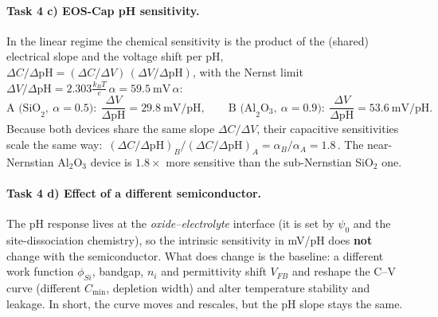 \paragraph{Task 4 c) EOS-Cap pH sensitivity.}
In the linear regime the chemical sensitivity is the product of the (shared) electrical slope and the
voltage shift per pH, $\Delta C/\Delta\mathrm{pH}=(\Delta C/\Delta V)\,(\Delta V/\Delta\mathrm{pH})$,
with the Nernst limit $\Delta V/\Delta\mathrm{pH}=2.303\tfrac{k_BT}{e}\,\alpha=\SI{59.5}{\milli\volt}\,\alpha$:
\[
\text{A (SiO}_2,\ \alpha=0.5):\ \frac{\Delta V}{\Delta\mathrm{pH}}=\SI{29.8}{\milli\volt}/\mathrm{pH},\qquad
\text{B (Al}_2\text{O}_3,\ \alpha=0.9):\ \frac{\Delta V}{\Delta\mathrm{pH}}=\SI{53.6}{\milli\volt}/\mathrm{pH}.
\]
Because both devices share the same slope $\Delta C/\Delta V$, their capacitive sensitivities scale
the same way: $\boxed{\,(\Delta C/\Delta\mathrm{pH})_B/(\Delta C/\Delta\mathrm{pH})_A=\alpha_B/\alpha_A=1.8\,}$.
The near-Nernstian Al$_2$O$_3$ device is $1.8\times$ more sensitive than the sub-Nernstian SiO$_2$ one.

\paragraph{Task 4 d) Effect of a different semiconductor.}
The pH response lives at the \emph{oxide--electrolyte} interface (it is set by $\psi_0$ and the
site-dissociation chemistry), so the intrinsic sensitivity in mV/pH does \textbf{not} change with the
semiconductor. What does change is the baseline: a different work function $\phi_{Si}$, bandgap, $n_i$
and permittivity shift $V_{FB}$ and reshape the C--V curve (different $C_{\min}$, depletion width) and
alter temperature stability and leakage. In short, the curve moves and rescales, but the pH
slope stays the same.
